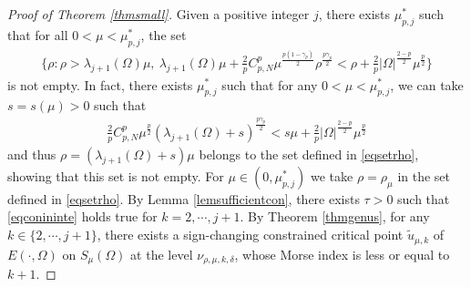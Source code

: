 \documentclass[10pt,a4paper]{article}
\theoremstyle{definition} \theoremstyle{remark}
\numberwithin{equation}{section}
\newcommand{\la}{\lambda}
\newcommand{\ga}{\gamma}
\begin{document}
\begin{proof}[Proof of Theorem \ref{thmsmall}]
Given a positive integer $j$, there exists $\mu^*_{p,j}$ such that for all $0 < \mu < \mu^*_{p,j}$, the set
\begin{align} \label{eqsetrho}
	\biggl\{\rho: \rho > \la_{j+1}(\Omega)\mu, \ \la_{j+1}(\Omega)\mu + \frac2p C_{p,N}^p \mu^{\frac{p(1-\ga_p)}{2}}\rho ^{\frac{p\ga_p}{2}} < \rho + \frac2p |\Omega|^{\frac{2-p}{2}}\mu^{\frac p2}\biggr\}
\end{align}
is not empty. In fact, there exists $\mu^*_{p,j}$ such that for any $0 < \mu < \mu^*_{p,j}$, we can take $s = s(\mu) > 0$ such that
\begin{align*}
	\frac2p C_{p,N}^p \mu^{\frac{p}{2}}(\la_{j+1}(\Omega) + s) ^{\frac{p\ga_p}{2}} < s\mu + \frac2p |\Omega|^{\frac{2-p}{2}}\mu^{\frac p2}
\end{align*}
and thus $\rho = (\la_{j+1}(\Omega) + s)\mu$ belongs to the set defined in \eqref{eqsetrho}, showing that this set is not empty. For $\mu \in (0,\mu^*_{p,j})$ we take $\rho = \rho_\mu$ in the set defined in \eqref{eqsetrho}. By Lemma \ref{lemsufficientcon}, there exists $\tau > 0$ such that \eqref{eqconininte} holds true for $k = 2,\cdots,j+1$. By Theorem \ref{thmgenus}, for any $k \in \{2,\cdots,j+1\}$, there exists a sign-changing constrained critical point $\tilde u_{\mu,k}$ of $E(\cdot,\Omega)$ on $S_\mu(\Omega)$ at the level $\nu_{\rho,\mu,k,\delta}$, whose Morse index is less or equal to $k+1$.


\end{proof}
\end{document}

